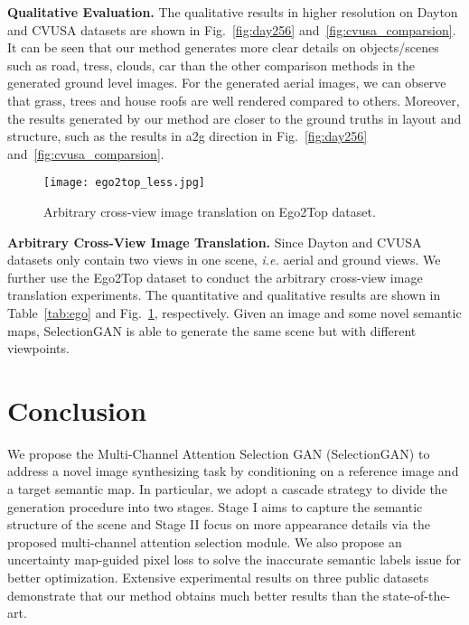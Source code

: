 \documentclass[10pt,twocolumn,letterpaper]{article}
\begin{document}
\noindent \textbf{Qualitative Evaluation.}
The qualitative results in higher resolution on Dayton and CVUSA datasets are shown in Fig.~\ref{fig:day256} and~\ref{fig:cvusa_comparsion}.
It can be seen that our method generates more clear details on objects/scenes such as road, tress, clouds, car than the other comparison methods in the generated ground level images. For the generated aerial images, we can observe that grass, trees and house roofs are well rendered compared to others.
Moreover, the results generated by our method are closer to the ground truths in layout and structure, such as the results in a2g direction in Fig.~\ref{fig:day256} and~\ref{fig:cvusa_comparsion}.

\begin{figure}[!t]\small
	\centering
	\texttt{[image: ego2top\_less.jpg]}
	\caption{Arbitrary cross-view image translation on Ego2Top dataset.
	}
	\label{fig:ego}
\end{figure}

\noindent \textbf{Arbitrary Cross-View Image Translation.}
Since Dayton and CVUSA datasets only contain two views in one scene, \emph{i.e.} aerial and ground views. We further use the Ego2Top dataset to conduct the arbitrary cross-view image translation experiments. The quantitative and qualitative results are shown in Table~\ref{tab:ego} and Fig.~\ref{fig:ego}, respectively. Given an image and some novel semantic maps, SelectionGAN is able to generate the same scene but with different viewpoints.

\vspace{-0.3cm}
\section{Conclusion}
\vspace{-0.2cm}
We propose the Multi-Channel Attention Selection GAN (SelectionGAN) to address a novel image synthesizing task by conditioning on a reference image and a target semantic map. In particular, we adopt a cascade strategy to divide the generation procedure into two stages. 
Stage I aims to capture the semantic structure of the scene and Stage II focus on more appearance details via the proposed multi-channel attention selection module. 
We also propose an uncertainty map-guided pixel loss to solve the inaccurate semantic labels issue for better optimization.
Extensive experimental results on three public datasets demonstrate that our method obtains much better results than the state-of-the-art. 
\end{document}
